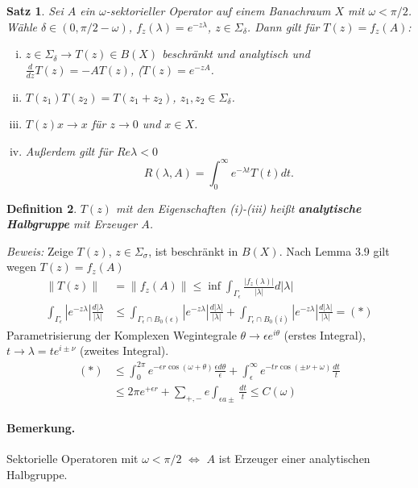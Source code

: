 \documentclass[12pt]{extreport} %
\newtheorem{Satz}{Satz}[subsection]
\newtheorem{Definition}[Satz]{Definition}
\numberwithin{equation}{section}
\newcommand{\om}{\omega}
\newcommand{\Bew}{\emph{Beweis: }}
\begin{document}
	\begin{Satz}
		Sei $A$ ein $\om$-sektorieller Operator auf einem Banachraum $X$ mit $\om<\pi/2$. Wähle $\delta\in (0, \pi/2 - \om)$, $f_z(\lambda) = e^{-z\lambda}$, $z\in \Sigma_\delta$. Dann gilt für $T(z) = f_z(A)$:
		\begin{enumerate}[(i)]
			\item $z\in \Sigma_\delta\rightarrow T(z)\in B(X)$ beschränkt und analytisch und $\frac{d}{dz}T(z) = -AT(z)$, ($T(z) = e^{-zA}$.
			\item $T(z_1)T(z_2) = T(z_1+z_2)$, $z_1,z_2\in \Sigma_\delta$.
			\item $T(z)x\rightarrow x$ für $z\rightarrow 0$ und $x\in X$.
			\item Außerdem gilt für $Re\lambda<0$
			$$R(\lambda, A) = \int_0^\infty e^{-\lambda t}T(t) dt.$$
		\end{enumerate}
	\end{Satz}
	
	\begin{Definition}
		$T(z)$ mit den Eigenschaften (i)-(iii) heißt \textbf{analytische Halbgruppe} mit Erzeuger $A$.
	\end{Definition}
	
	\Bew Zeige $T(z)$, $z\in \Sigma_\sigma$, ist beschränkt in $B(X)$. Nach Lemma 3.9 gilt wegen $T(z) = f_z(A)$
	\begin{align*}
		\|T(z)\| &= \|f_z(A)\| \leq \inf \int_{\Gamma_\epsilon} \frac{|f_z(\lambda)|}{|\lambda|} d|\lambda|\\
		\int_{\Gamma_\epsilon} |e^{-z\lambda}|\frac{d|\lambda}{|\lambda|} &\leq \int_{\Gamma_\epsilon\cap B_0(\epsilon)} |e^{-z\lambda}|\frac{d|\lambda|}{|\lambda|} +\int_{\Gamma_\epsilon \cap B_0(i)} |e^{-z\lambda}|\frac{d|\lambda|}{|\lambda|} = (*)
	\end{align*}
	Parametrisierung der Komplexen Wegintegrale $\theta\rightarrow \epsilon e^{i\theta}$ (erstes Integral), $t\rightarrow \lambda = te^{i\pm\nu}$ (zweites Integral).
	\begin{align*}
		(*)&\leq \int_0^{2\pi} e^{-\epsilon r\cos(\om+\theta)}\frac{\epsilon d\theta}{\epsilon} + \int_\epsilon^\infty e^{-tr\cos(\pm\nu + \om)}\frac{dt}{t}\\
		&\leq 2\pi e^{+\epsilon r} + \sum_{+,-} e \int_{\epsilon a\pm} \frac{dt}{t}\leq C(\om) 
	\end{align*}
	
	\paragraph{Bemerkung.} Sektorielle Operatoren mit $\om<\pi/2$ $\Leftrightarrow$ $A$ ist Erzeuger einer analytischen Halbgruppe.
	
	
	
	
	
	
	
	
	
	
	
	
	
	
	
	
	
	
	
	
	
	
	
	
	
	
	
	
	
	
	
	
	
\end{document}
